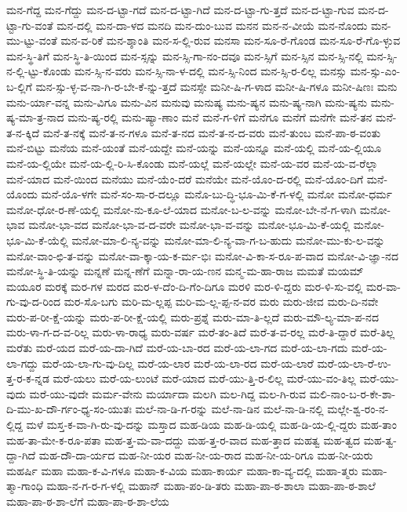 {ಮನ-ಗೆದ್ದ
ಮನ-ಗೆದ್ದು
ಮನ-ದ-ಟ್ಟಾ-ಗದೆ
ಮನ-ದ-ಟ್ಟಾ-ಗಿದೆ
ಮನ-ದ-ಟ್ಟಾ-ಗು-ತ್ತದೆ
ಮನ-ದ-ಟ್ಟಾ-ಗುವ
ಮನ-ದ-ಟ್ಟಾ-ಗು-ವಂತೆ
ಮನ-ದಲ್ಲಿ
ಮನ-ದಾ-ಳದ
ಮನದಿ
ಮನ-ದುಂ-ಬುವ
ಮನನ
ಮನ-ನ-ವೀಯೆ
ಮನ-ನೊಂದು
ಮನ-ಮು-ಟ್ಟು-ವಂತೆ
ಮನ-ವ-ರಿಕೆ
ಮನ-ಶ್ಶಾಂತಿ
ಮನ-ಸ-ಲ್ಲಿ-ರುವ
ಮನಸಾ
ಮನ-ಸೂ-ರೆ-ಗೊಂಡ
ಮನ-ಸೂ-ರೆ-ಗೊ-ಳ್ಳುವ
ಮನ-ಸ್ಥಿ-ತಿಗೆ
ಮನ-ಸ್ಥಿ-ತಿ-ಯಿಂದ
ಮನ-ಸ್ಸನ್ನು
ಮನ-ಸ್ಸಿ-ಗಾ-ನಂ-ದವೂ
ಮನ-ಸ್ಸಿಗೆ
ಮನ-ಸ್ಸಿನ
ಮನ-ಸ್ಸಿ-ನಲ್ಲಿ
ಮನ-ಸ್ಸಿ-ನ-ಲ್ಲಿ-ಟ್ಟು-ಕೊಂಡು
ಮನ-ಸ್ಸಿ-ನ-ವರು
ಮನ-ಸ್ಸಿ-ನಾ-ಳ-ದಲ್ಲಿ
ಮನ-ಸ್ಸಿ-ನಿಂದ
ಮನ-ಸ್ಸಿ-ರ-ಲಿಲ್ಲ
ಮನಸ್ಸು
ಮನ-ಸ್ಸು-ಎಂ-ಬ-ಲ್ಲಿಗೆ
ಮನ-ಸ್ಸು-ಳ್ಳ-ವ-ನಾ-ಗಿ-ರ-ಬೇ-ಕೆ-ನ್ನು-ತ್ತದೆ
ಮನಸ್ಸೇ
ಮನೀ-ಷಿ-ಗ-ಳಾದ
ಮನೀ-ಷಿ-ಗಳೂ
ಮನೀ-ಷಿಣಃ
ಮನು
ಮನು-ರ್ಯಾ-ವನ್ನ
ಮನು-ವಿಗೂ
ಮನು-ವಿನ
ಮನುವು
ಮನುಷ್ಯ
ಮನು-ಷ್ಯನ
ಮನು-ಷ್ಯ-ನಾಗಿ
ಮನು-ಷ್ಯನು
ಮನು-ಷ್ಯ-ಮಾ-ತ್ರ-ನಾದ
ಮನು-ಷ್ಯ-ರಲ್ಲಿ
ಮನು-ಷ್ಯಾ-ಣಾಂ
ಮನೆ
ಮನೆ-ಗ-ಳಿಗೆ
ಮನೆಗೂ
ಮನೆಗೆ
ಮನೆಗೇ
ಮನೆ-ತನ
ಮನೆ-ತ-ನ-ಕ್ಕಿದೆ
ಮನೆ-ತ-ನಕ್ಕೆ
ಮನೆ-ತ-ನ-ಗಳೂ
ಮನೆ-ತ-ನದ
ಮನೆ-ತ-ನ-ದ-ವರು
ಮನೆ-ತುಂಬ
ಮನೆ-ಪಾ-ಠ-ವಂತು
ಮನೆ-ಬಿಟ್ಟು
ಮನೆಯ
ಮನೆ-ಯಂತೆ
ಮನೆ-ಯದ್ದೇ
ಮನೆ-ಯನ್ನು
ಮನೆ-ಯನ್ನೂ
ಮನೆ-ಯಲ್ಲಿ
ಮನೆ-ಯ-ಲ್ಲಿಯೂ
ಮನೆ-ಯ-ಲ್ಲಿಯೇ
ಮನೆ-ಯ-ಲ್ಲಿ-ರಿ-ಸಿ-ಕೊಂಡು
ಮನೆ-ಯಲ್ಲೆ
ಮನೆ-ಯಲ್ಲೇ
ಮನೆ-ಯ-ವರ
ಮನೆ-ಯ-ವ-ರೆಲ್ಲಾ
ಮನೆ-ಯಾದ
ಮನೆ-ಯಿಂದ
ಮನೆಯು
ಮನೆ-ಯೆಂ-ದರೆ
ಮನೆಯೇ
ಮನೆ-ಯೊಂ-ದ-ರಲ್ಲಿ
ಮನೆ-ಯೊಂ-ದಿಗೆ
ಮನೆ-ಯೊಂದು
ಮನೆ-ಯೊ-ಳಗೇ
ಮನೆ-ಸಂ-ಸಾ-ರ-ದಲ್ಲೂ
ಮನೊ-ಬು-ದ್ಧಿ-ಭೂ-ಮಿ-ಕೆ-ಗ-ಳಲ್ಲಿ
ಮನೋ
ಮನೋ-ಧರ್ಮ
ಮನೋ-ಧೋ-ರ-ಣೆ-ಯಲ್ಲಿ
ಮನೋ-ನು-ಕೂ-ಲೆ-ಯಾದ
ಮನೋ-ಬ-ಲ-ವನ್ನು
ಮನೋ-ಬೇ-ನೆ-ಗ-ಳಾಗಿ
ಮನೋ-ಭಾವ
ಮನೋ-ಭಾ-ವದ
ಮನೋ-ಭಾ-ವ-ದ-ವರೇ
ಮನೋ-ಭಾ-ವ-ವನ್ನು
ಮನೋ-ಭೂ-ಮಿ-ಕೆ-ಯಲ್ಲಿ
ಮನೋ-ಭೂ-ಮಿ-ಕೆ-ಯೆಲ್ಲಿ
ಮನೋ-ಮಾ-ಲಿ-ನ್ಯ-ವನ್ನು
ಮನೋ-ಮಾ-ಲಿ-ನ್ಯ-ವಾ-ಗ-ಬ-ಹುದು
ಮನೋ-ಮು-ಕು-ಲ-ವನ್ನು
ಮನೋ-ವಾಂ-ಛಿ-ತ-ವನ್ನು
ಮನೋ-ವಾ-ಕ್ಕಾ-ಯ-ಕ-ರ್ಮ-ಭಿಃ
ಮನೋ-ವಿ-ಕಾ-ಸ-ರೂ-ಪ-ವಾದ
ಮನೋ-ವಿ-ಜ್ಞಾ-ನದ
ಮನೋ-ಸ್ಥಿ-ತಿ-ಯನ್ನು
ಮನ್ನಣೆ
ಮನ್ನ-ಣೆಗೆ
ಮನ್ನಾ-ರಾ-ಯ-ಣನ
ಮನ್ಮ-ಮ-ಹಾ-ರಾಜ
ಮಮತೆ
ಮಯಮ್
ಮಯೂರ
ಮರಕ್ಕೆ
ಮರ-ಗಳ
ಮರದ
ಮರ-ಳ-ದೆಂ-ದಿ-ಗೆಂ-ದಿಗೂ
ಮರಳಿ
ಮರ-ಳಿ-ದ್ದರು
ಮರ-ಳಿ-ಸು-ವಲ್ಲಿ
ಮರ-ವಾ-ಗು-ವು-ದ-ರಿಂದ
ಮರ-ಸೊ-ಬಗು
ಮರಿ-ಮ-ಲ್ಲಪ್ಪ
ಮರಿ-ಮ-ಲ್ಲ-ಪ್ಪ-ನ-ವರ
ಮರು
ಮರು-ಜೀವ
ಮರು-ದಿ-ನವೇ
ಮರು-ಪ-ರೀ-ಕ್ಷೆ-ಯನ್ನು
ಮರು-ಪ-ರೀ-ಕ್ಷೆ-ಯಲ್ಲಿ
ಮರು-ಪ್ರಶ್ನೆ
ಮರು-ಮಾ-ತಿ-ಲ್ಲದೆ
ಮರು-ಮೌ-ಲ್ಯ-ಮಾ-ಪ-ನದ
ಮರು-ಳಾ-ಗ-ದ-ವ-ರಿಲ್ಲ
ಮರು-ಳಾ-ರಾಧ್ಯ
ಮರು-ವರ್ಷ
ಮರೆ-ತಂ-ತಿದೆ
ಮರೆ-ತ-ವ-ರಲ್ಲ
ಮರೆ-ತಿ-ದ್ದಾರೆ
ಮರೆ-ತಿಲ್ಲ
ಮರೆತು
ಮರೆ-ಯದ
ಮರೆ-ಯ-ದಾ-ಗಿದೆ
ಮರೆ-ಯ-ಬಾ-ರದ
ಮರೆ-ಯ-ಲಾ-ಗದ
ಮರೆ-ಯ-ಲಾ-ಗದು
ಮರೆ-ಯ-ಲಾ-ಗದ್ದು
ಮರೆ-ಯ-ಲಾ-ಗು-ವು-ದಿಲ್ಲ
ಮರೆ-ಯ-ಲಾರ
ಮರೆ-ಯ-ಲಾ-ರದ
ಮರೆ-ಯ-ಲಾರೆ
ಮರೆ-ಯ-ಲಾ-ರೆ-ಉ-ತ್ತ-ರ-ಕ-ನ್ನಡ
ಮರೆ-ಯಲು
ಮರೆ-ಯ-ಲುಂಟೆ
ಮರೆ-ಯಾದ
ಮರೆ-ಯು-ತ್ತಿ-ರ-ಲಿಲ್ಲ
ಮರೆ-ಯು-ವಂ-ತಿಲ್ಲ
ಮರೆ-ಯು-ವುದು
ಮರೆ-ಯು-ವುದೇ
ಮರ್ಮ-ವೇನು
ಮರ್ಯಾದಾ
ಮಲಗಿ
ಮಲ-ಗಿದ್ದ
ಮಲ-ಗಿ-ರುವ
ಮಲಿ-ನಾಂ-ಬ-ರ-ಕೇ-ಶಾ-ದಿ-ಮು-ಖ-ದೌ-ರ್ಗಂ-ಧ್ಯ-ಸಂ-ಯುತಃ
ಮಲೆ-ನಾ-ಡಿ-ಗ-ರನ್ನು
ಮಲೆ-ನಾ-ಡಿನ
ಮಲೆ-ನಾ-ಡಿ-ನಲ್ಲಿ
ಮಲ್ಲೇ-ಶ್ವ-ರಂ-ನ-ಲ್ಲಿದ್ದ
ಮಳೆ
ಮಸ್ತ-ಕ-ವಾ-ಗಿ-ರು-ವು-ದನ್ನು
ಮಸ್ತಾದ
ಮಹ-ಡಿಯ
ಮಹ-ಡಿ-ಯಲ್ಲಿ
ಮಹ-ಡಿ-ಯ-ಲ್ಲಿ-ದ್ದರು
ಮಹ-ತಾಂ
ಮಹ-ತಾ-ಮೇ-ಕ-ರೂ-ಪತಾ
ಮಹ-ತ್ತ-ಮ-ವಾ-ದದ್ದು
ಮಹ-ತ್ತ-ರ-ವಾದ
ಮಹ-ತ್ತಾದ
ಮಹತ್ವ
ಮಹ-ತ್ವದ
ಮಹ-ತ್ವ-ದ್ದಾ-ಗಿದೆ
ಮಹ-ದೌ-ದಾ-ರ್ಯದ
ಮಹ-ನೀ-ಯರ
ಮಹ-ನೀ-ಯ-ರಾದ
ಮಹ-ನೀ-ಯ-ರಿಗೂ
ಮಹ-ನೀ-ಯರು
ಮಹರ್ಷಿ
ಮಹಾ
ಮಹಾ-ಕ-ವಿ-ಗಳೂ
ಮಹಾ-ಕ-ವಿಯ
ಮಹಾ-ಕಾರ್ಯ
ಮಹಾ-ಕಾ-ವ್ಯ-ದಲ್ಲಿ
ಮಹಾ-ತ್ಮರು
ಮಹಾ-ತ್ಮಾ-ಗಾಂಧಿ
ಮಹಾ-ನ-ಗ-ರ-ಗ-ಳಲ್ಲಿ
ಮಹಾನ್
ಮಹಾ-ಪಂ-ಡಿ-ತರು
ಮಹಾ-ಪಾ-ಠ-ಶಾಲಾ
ಮಹಾ-ಪಾ-ಠ-ಶಾಲೆ
ಮಹಾ-ಪಾ-ಠ-ಶಾ-ಲೆಗೆ
ಮಹಾ-ಪಾ-ಠ-ಶಾ-ಲೆಯ
}
